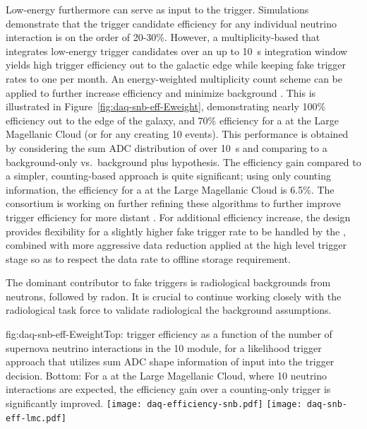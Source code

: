 Low-energy  furthermore can serve as input to the
 trigger. Simulations demonstrate that the trigger candidate
efficiency for any individual  neutrino interaction is on the order
of 20-30\%. However, a multiplicity-based 
 that integrates low-energy trigger candidates over an up to \SI{10}{\second}
integration window yields high trigger efficiency out to the
galactic edge while keeping fake  trigger rates to one per
month. An energy-weighted multiplicity count scheme can be
applied to further increase efficiency and minimize background
\cite{bib:docdb14522}. This is illustrated in
Figure~\ref{fig:daq-snb-eff-Eweight}, demonstrating nearly 100\% efficiency
out to the edge of the galaxy, and 70\% efficiency for a  at
the Large Magellanic Cloud (or for any  creating 10
events). This performance is obtained by considering the sum ADC
distribution of  over \SI{10}{\second} and comparing to a background-only
vs.~background plus  hypothesis. The efficiency gain compared to a
simpler,  counting-based approach is quite significant; using
only counting information, the efficiency for a  at
the Large Magellanic Cloud is 6.5\%. The 
consortium is working on further refining these algorithms to further improve
 trigger efficiency for more distant . For
additional efficiency increase, the design provides flexibility
for a slightly higher fake  trigger rate to be handled by
the , combined with more aggressive data reduction
applied at the high level trigger stage so as to respect the data rate to
offline storage requirement.

The dominant contributor to fake  triggers is
radiological backgrounds from neutrons, followed by radon. It is
crucial to continue working closely with the radiological task force
to validate radiological the background assumptions.

\begin{dunefigure}{fig:daq-snb-eff-Eweight}{Top:  trigger
    efficiency as a function of the number of supernova neutrino
    interactions in the \SI{10}{\kt} module, for a likelihood trigger
    approach that utilizes sum ADC shape information of
     input into the trigger decision. Bottom:
    For a  at the Large Magellanic Cloud, where 10 neutrino
  interactions are expected, the efficiency gain over a counting-only
  trigger is significantly improved. } %
\texttt{[image: daq-efficiency-snb.pdf]}%
\newline
\texttt{[image: daq-snb-eff-lmc.pdf]}%
\end{dunefigure}

